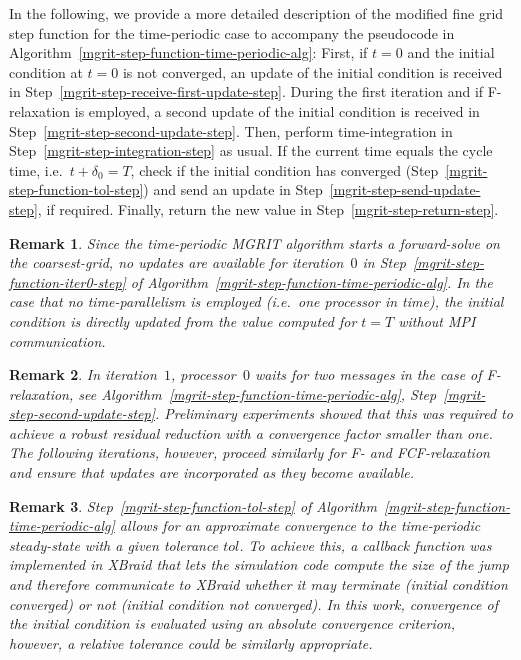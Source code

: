 \documentclass[3p]{elsarticle}
\newtheorem{remark}{Remark}
\begin{document}
In the following, we provide a more detailed description
of the modified fine grid step function for the time-periodic case
to accompany the pseudocode in Algorithm~\ref{mgrit-step-function-time-periodic-alg}:
First, if $t = 0$ and the initial condition at $t = 0$ is not converged,
an update of the initial condition is received
in Step~\ref{mgrit-step-receive-first-update-step}.
During the first iteration and if F-relaxation is employed,
a second update of the initial condition is received
in Step~\ref{mgrit-step-second-update-step}.
Then, perform time-integration in Step~\ref{mgrit-step-integration-step} as usual.
If the current time equals the cycle time, i.e.\ $t + \delta_0 = T$,
check if the initial condition has converged (Step~\ref{mgrit-step-function-tol-step})
and send an update in Step~\ref{mgrit-step-send-update-step}, if required.
Finally, return the new value in Step~\ref{mgrit-step-return-step}.

\begin{remark}
    Since the time-periodic MGRIT algorithm starts a forward-solve on the coarsest-grid,
    no updates are available for iteration~$0$ in Step~\ref{mgrit-step-function-iter0-step}
    of Algorithm~\ref{mgrit-step-function-time-periodic-alg}.
    In the case that no time-parallelism is employed (i.e.\ one processor in time),
    the initial condition is directly updated from the value computed for $t = T$ without MPI communication.
            \end{remark}

\begin{remark}
    In iteration~$1$, processor~$0$ waits for two messages in the case of F-relaxation,
    see Algorithm~\ref{mgrit-step-function-time-periodic-alg}, Step~\ref{mgrit-step-second-update-step}.
    Preliminary experiments showed that this was required to achieve a robust residual reduction
    with a convergence factor smaller than one.
    The following iterations, however, proceed similarly for F- and FCF-relaxation
    and ensure that updates are incorporated as they become available.
\end{remark}

\begin{remark}
    Step~\ref{mgrit-step-function-tol-step} of Algorithm~\ref{mgrit-step-function-time-periodic-alg}
    allows for an approximate convergence to the time-periodic steady-state with a given tolerance \emph{$tol$}.
    To achieve this, a \emph{callback} function was implemented in {XBraid} that lets the simulation code
    compute the size of the jump and therefore communicate to {XBraid}
    whether it may terminate (initial condition converged)
    or not (initial condition \emph{not} converged).
    In this work, convergence of the initial condition is evaluated using
    an absolute convergence criterion, however,
    a relative tolerance could be similarly appropriate.
\end{remark}
\end{document}
